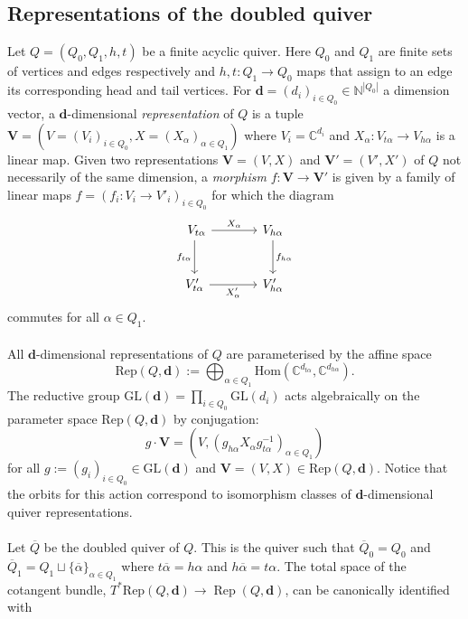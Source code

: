 \documentclass{amsart}
\theoremstyle{plain}
\numberwithin{equation}{section}
\theoremstyle{definition}
\theoremstyle{remark}
\begin{document}
	\subsection{Representations of the doubled quiver}\label{repsDoubleQuiverSection}
	Let $Q=(Q_0,Q_1,h,t)$ be a finite acyclic quiver. Here $Q_0$ and $Q_1$ are finite sets of vertices and edges respectively and $h,t:Q_1\to Q_0$ maps that assign to an edge its corresponding head and tail vertices. For $\mathbf{d}=(d_i)_{i\in Q_0}\in \mathbb{N}^{|Q_0|}$ a dimension vector, a $\mathbf{d}$-dimensional \emph{representation} of $Q$ is a tuple $\mathbf{V}=(V=(V_i)_{i\in Q_0},X=(X_{\alpha})_{\alpha\in Q_1})$ where $V_i=\mathbb{C}^{d_i}$ and $X_{\alpha}:V_{t\alpha}\to V_{h\alpha}$ is a linear map. Given two representations $\mathbf{V}=(V,X)$ and $\mathbf{V}'=(V',X')$ of $Q$ not necessarily of the same dimension, a \emph{morphism} $f:\mathbf{V}\to \mathbf{V}'$ is given by a family of linear maps $f=(f_i:V_i\to V'_i)_{i\in Q_0}$ for which the diagram  
	\begin{equation}\label{RepMorphismDiagram}
		\begin{tikzcd}[column sep =large, row sep =large]\
			V_{t\alpha} \arrow[r,"X_\alpha"] \arrow[d,"f_{t\alpha}",'] & V_{h\alpha}\arrow[d,"f_{h\alpha}"] \\
			V'_{t\alpha}\arrow[r,',"X'_\alpha"] & V'_{h\alpha}
		\end{tikzcd}
	\end{equation}
	commutes for all $\alpha\in Q_1$. 
	\\
	\\
	All $\mathbf{d}$-dimensional representations of $Q$ are parameterised  by the affine space
	$$
	\text{Rep}(Q,\mathbf{d}):=\bigoplus_{\alpha\in Q_1}\text{Hom}(\mathbb{C}^{d_{t\alpha}},\mathbb{C}^{d_{h\alpha}}).
	$$
	The reductive group $\text{GL}(\mathbf{d})=\prod_{i\in Q_0}\text{GL}(d_i)$ acts algebraically on the parameter space $\text{Rep}(Q,\mathbf{d})$ by conjugation:
	\begin{equation}\label{actionGLOnQuiverReps}
		g\cdot \mathbf{V}=(V,(g_{h\alpha}X_\alpha g_{t\alpha}^{-1})_{\alpha\in Q_1})
	\end{equation}
	for all $g:=(g_i)_{i\in Q_0}\in \text{GL}(\mathbf{d})$ and $\mathbf{V}=(V,X)\in \text{Rep}(Q,\mathbf{d})$. Notice that the orbits for this action correspond to isomorphism classes of $\mathbf{d}$-dimensional quiver representations.
	\\
	\\
	Let $\overline{Q}$ be the doubled quiver of $Q$. This is the quiver such that $\overline{Q}_0=Q_0$ and $\overline{Q}_1=Q_1\sqcup \{\overline{\alpha}\}_{\alpha\in Q_1}$ where $t\overline{\alpha}=h\alpha$ and $h\overline{\alpha}=t\alpha$. The total space of the cotangent bundle, $T^*\text{Rep}(Q,\mathbf{d})\to \operatorname{Rep}(Q,\mathbf{d})$, can be canonically identified with
\end{document}
